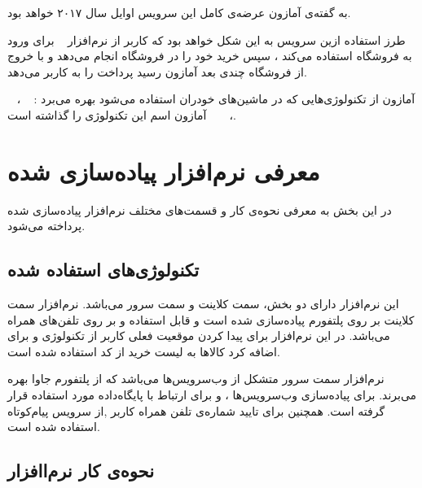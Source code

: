 \documentclass[oneside]{report}
\begin{document}
 	به گفته‌ی آمازون	عرضه‌ی کامل این سرویس اوایل سال ۲۰۱۷ خواهد بود. 
 		
 		طرز استفاده ازین سرویس به این شکل خواهد بود که کاربر از نرم‌افزار 
 		 		{\normalsize {}} 		
 برای ورود به فروشگاه استفاده می‌کند ، سپس خرید خود را در فروشگاه انجام می‌دهد و با خروج از فروشگاه چندی بعد آمازون رسید پرداخت را به کاربر می‌دهد.

آمازون	از تکنولوژی‌هایی که در ماشین‌های خودران استفاده می‌شود بهره می‌برد : 
 					 			{\normalsize {}} ،
 					 				{\normalsize {}} ،
 					 					{\normalsize {}}
 					 					 
 \noindent
 آمازون اسم این تکنولوژی را 
 	{\normalsize {}}
 	گذاشته است.
 	\cite{amazongo}
 			 			 		
 			 			 			 				 			 			 	 
  	\section{معرفی نرم‌‌افزار پیاده‌سازی شده}
   در این بخش به معرفی نحوه‌ی کار و قسمت‌های مختلف نرم‌افزار پیاده‌سازی شده  پرداخته می‌شود. 
   
   		   \subsection{تکنولوژی‌های استفاده شده}
   		 این نرم‌افزار  دارای دو بخش، سمت کلاینت و سمت سرور می‌باشد. نرم‌افزار سمت کلاینت بر روی پلتفورم 
   		 {\normalsize{}}
   		 پیاده‌سازی شده است  و قابل استفاده و بر روی تلفن‌های همراه 
   		 {\normalsize{}}
   		 می‌باشد. در این نرم‌افزار برای پیدا کردن موقعیت فعلی کاربر از تکنولوژی 
   		 {\normalsize{}}
   		و برای اضافه کرد کالا‌ها به لیست خرید از 
   		  {\normalsize{}} 
   		   		 کد 
   		 استفاده شده است. 
   		 
   		 
   		  نرم‌افزار سمت سرور متشکل‌ از وب‌سرویس‌ها می‌باشد که از پلتفورم جاوا بهره می‌برند.  
   		  برای پیاده‌سازی وب‌سرویس‌ها ،
   		     		 {\normalsize{}}
   		     		 و برای ارتباط با پایگاه‌داده  
   		     		    		 {\normalsize{}}
   		     		    		 مورد استفاده قرار گرفته است.
   		  همچنین برای تایید شماره‌ی تلفن همراه کاربر ,از  سرویس پیام‌کوتاه استفاده شده است.
   		  
		   \subsection{نحوه‌ی کار نرم‌اافزار}
\end{document}
